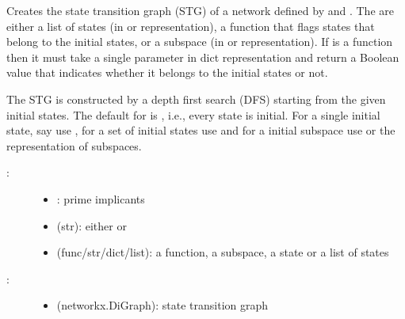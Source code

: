\documentclass[letterpaper,10pt,english]{sphinxmanual}
\begin{document}
\begin{fulllineitems}
\label{\detokenize{StateTransitionGraphs:PyBoolNet.StateTransitionGraphs.primes2stg}}
Creates the state transition graph (STG) of a network defined by  and .
The  are either a list of states (in  or  representation),
a function that flags states that belong to the initial states, or
a subspace (in  or  representation).
If  is a function then it must take a single parameter  in dict representation
and return a Boolean value that indicates whether it belongs to the initial states or not.

The STG is constructed by a depth first search (DFS) starting from the given initial states.
The default for  is , i.e., every state is initial.
For a single initial state, say  use ,
for a set of initial states use  and
for a initial subspace use  or the  representation of subspaces.
\begin{description}
\item[{:}] \leavevmode\begin{itemize}
\item {} 
: prime implicants

\item {} 
 (str): either  or 

\item {} 
 (func/str/dict/list): a function, a subspace, a state or a list of states

\end{itemize}

\item[{:}] \leavevmode\begin{itemize}
\item {} 
 (networkx.DiGraph): state transition graph


\end{itemize}
\end{description}
\end{fulllineitems}
\end{document}

